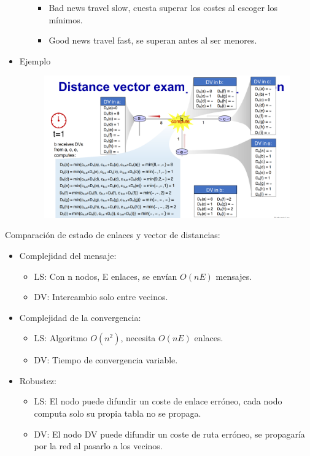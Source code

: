 \documentclass[12pt, twoside, openright]{report} %
\begin{document}
\begin{itemize}
\begin{itemize}
		            \begin{itemize}
			            \item Bad news travel slow, cuesta superar los costes al escoger los
			                  mínimos.
			            \item Good news travel fast, se superan antes al ser menores.
		            \end{itemize}
	      \end{itemize}
	\item Ejemplo
	      \begin{figure}[H]
		      {\includegraphics[scale=.25]{Untitled 44.png}}
	      \end{figure}
\end{itemize}


Comparación de estado de enlaces y vector de distancias:

\begin{itemize}
	\item Complejidad del mensaje:

	      \begin{itemize}
		      \item LS: Con n nodos, E enlaces, se envían \(O(nE)\) mensajes.
		      \item DV: Intercambio solo entre vecinos.
	      \end{itemize}
	\item Complejidad de la convergencia:

	      \begin{itemize}
		      \item LS: Algoritmo \(O(n^2)\), necesita \(O(nE)\) enlaces.
		      \item DV: Tiempo de convergencia variable.
	      \end{itemize}
	      \pagebreak
	\item Robustez:

	      \begin{itemize}
		      \item LS: El nodo puede difundir un coste de enlace erróneo, cada nodo
		            computa solo su propia tabla no se propaga.
		      \item DV: El nodo DV puede difundir un coste de ruta erróneo, se
		            propagaría por la red al pasarlo a los vecinos.
	      \end{itemize}
\end{itemize}
\end{document}
